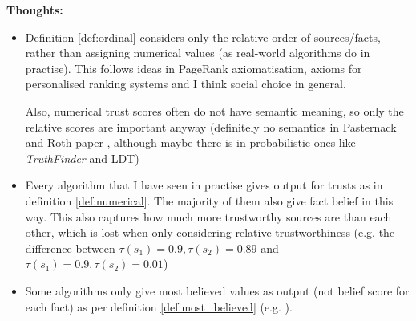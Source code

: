 \documentclass{article}
\theoremstyle{definition}
\theoremstyle{plain}
\begin{document}
\textbf{Thoughts:}
\begin{itemize}

\item Definition \ref{def:ordinal} considers only the relative order of
sources/facts, rather than assigning numerical values (as real-world algorithms
do in practise). This follows ideas in PageRank axiomatisation{\cite{altman}},
axioms for personalised ranking systems{\cite{altman_personalised}} and I think
social choice in general.

Also, numerical trust scores often do not have semantic meaning, so only the
relative scores are important anyway (definitely no semantics in Pasternack and
Roth paper \cite{pasternack}, although maybe there is in probabilistic ones
like \emph{TruthFinder}\cite{yin_han_yu} and LDT\cite{zhang_qi_tang})

\item Every algorithm that I have seen in practise gives output for trusts as
in definition \ref{def:numerical}. The majority of them also give fact belief
in this way. This also captures how much more trustworthy sources are than each
other, which is lost when only considering relative trustworthiness (e.g. the
difference between $\tau(s_1) = 0.9, \tau(s_2) = 0.89$ and $\tau(s_1) = 0.9,
\tau(s_2) = 0.01$)

\item Some algorithms only give most believed values as output (not belief
score for each fact) as per definition \ref{def:most_believed} (e.g.
\cite{li_conflicts}).

\end{itemize}

{}


\end{document}
